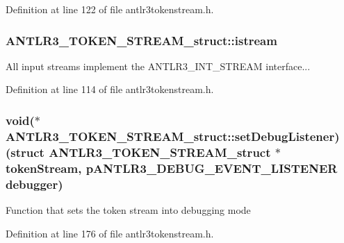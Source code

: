 Definition at line 122 of file antlr3tokenstream.\-h.

\hypertarget{struct_a_n_t_l_r3___t_o_k_e_n___s_t_r_e_a_m__struct_ad380e088966f96866d8d35cf5f03b935}{
\subsubsection[{istream}]{ A\-N\-T\-L\-R3\-\_\-\-T\-O\-K\-E\-N\-\_\-\-S\-T\-R\-E\-A\-M\-\_\-struct\-::istream}}\label{struct_a_n_t_l_r3___t_o_k_e_n___s_t_r_e_a_m__struct_ad380e088966f96866d8d35cf5f03b935}
All input streams implement the A\-N\-T\-L\-R3\-\_\-\-I\-N\-T\-\_\-\-S\-T\-R\-E\-A\-M interface... 

Definition at line 114 of file antlr3tokenstream.\-h.

\hypertarget{struct_a_n_t_l_r3___t_o_k_e_n___s_t_r_e_a_m__struct_a8bca05af8122d0235fda5888c9fda1b8}{
\subsubsection[{set\-Debug\-Listener}]{\setlength{\rightskip}{0pt plus 5cm}void($\ast$ A\-N\-T\-L\-R3\-\_\-\-T\-O\-K\-E\-N\-\_\-\-S\-T\-R\-E\-A\-M\-\_\-struct\-::set\-Debug\-Listener)(struct {\bf A\-N\-T\-L\-R3\-\_\-\-T\-O\-K\-E\-N\-\_\-\-S\-T\-R\-E\-A\-M\-\_\-struct} $\ast$token\-Stream, {\bf p\-A\-N\-T\-L\-R3\-\_\-\-D\-E\-B\-U\-G\-\_\-\-E\-V\-E\-N\-T\-\_\-\-L\-I\-S\-T\-E\-N\-E\-R} {\bf debugger})}}\label{struct_a_n_t_l_r3___t_o_k_e_n___s_t_r_e_a_m__struct_a8bca05af8122d0235fda5888c9fda1b8}
Function that sets the token stream into debugging mode 

Definition at line 176 of file antlr3tokenstream.\-h.

